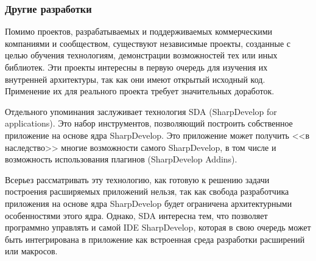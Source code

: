 \subsubsection{Другие разработки}

Помимо проектов, разрабатываемых и поддерживаемых коммерческими компаниями и сообществом, существуют независимые проекты, созданные с целью обучения технологиям, демонстрации возможностей тех или иных библиотек. Эти проекты интересны в первую очередь для изучения их внутренней архитектуры, так как они имеют открытый исходный код. Применение их для реального проекта требует значительных доработок.

Отдельного упоминания заслуживает технология SDA (SharpDevelop  for applications). Это набор инструментов, позволяющий построить собственное приложение на основе ядра SharpDevelop. Это приложение может получить <<в наследство>> многие возможности самого SharpDevelop, в том числе и возможность использования плагинов (SharpDevelop Addins).

Всерьез рассматривать эту технологию, как готовую к решению задачи построения расширяемых приложений нельзя, так как свобода разработчика приложения на основе ядра SharpDevelop будет ограничена архитектурными особенностями этого ядра. Однако, SDA интересна тем, что позволяет программно управлять и самой IDE SharpDevelop, которая в свою очередь может быть интегрирована в приложение как встроенная среда разработки расширений или макросов.